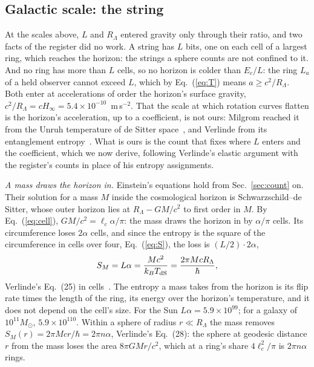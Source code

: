 \documentclass[aps,prd,twocolumn,superscriptaddress,nofootinbib,showkeys]{revtex4-2}
\newcommand{\lc}{\ell_c}
\newcommand{\Ec}{E_c}
\newcommand{\RL}{R_\Lambda}
\begin{document}
\subsection{Galactic scale: the string}\label{sec:galactic}

At the scales above, $L$ and $\RL$ entered gravity only through their ratio, and two facts of the register did no work. A string has $L$ bits, one on each cell of a largest ring, which reaches the horizon: the strings a sphere counts are not confined to it. And no ring has more than $L$ cells, so no horizon is colder than $\Ec/L$: the ring $L_a$ of a held observer cannot exceed $L$, which by Eq.~(\ref{eq:T}) means $a \ge c^2/\RL$. Both enter at accelerations of order the horizon's surface gravity, $c^2/\RL = cH_\infty = 5.4\times10^{-10}$~m\,s$^{-2}$. That the scale at which rotation curves flatten is the horizon's acceleration, up to a coefficient, is not ours: Milgrom reached it from the Unruh temperature of de Sitter space~\cite{milgrom1999}, and Verlinde from its entanglement entropy~\cite{verlinde2017}. What is ours is the count that fixes where $L$ enters and the coefficient, which we now derive, following Verlinde's elastic argument with the register's counts in place of his entropy assignments.

\textit{A mass draws the horizon in.} Einstein's equations hold from Sec.~\ref{sec:count} on. Their solution for a mass $M$ inside the cosmological horizon is Schwarzschild--de Sitter, whose outer horizon lies at $\RL - GM/c^2$ to first order in $M$. By Eq.~(\ref{eq:cell}), $GM/c^2 = \lc\alpha/\pi$: the mass draws the horizon in by $\alpha/\pi$ cells. Its circumference loses $2\alpha$ cells, and since the entropy is the square of the circumference in cells over four, Eq.~(\ref{eq:S}), the loss is $(L/2)\cdot2\alpha$,
\begin{equation}
S_M = L\alpha = \frac{Mc^2}{k_BT_{\rm dS}} = \frac{2\pi Mc\RL}{\hbar} ,
\label{eq:SM}
\end{equation}
Verlinde's Eq.~(25) in cells~\cite{verlinde2017}. The entropy a mass takes from the horizon is its flip rate times the length of the ring, its energy over the horizon's temperature, and it does not depend on the cell's size. For the Sun $L\alpha = 5.9\times10^{99}$; for a galaxy of $10^{11}M_\odot$, $5.9\times10^{110}$. Within a sphere of radius $r\ll\RL$ the mass removes $S_M(r) = 2\pi Mcr/\hbar = 2\pi n\alpha$, Verlinde's Eq.~(28): the sphere at geodesic distance $r$ from the mass loses the area $8\pi GMr/c^2$, which at a ring's share $4\lc^2/\pi$ is $2\pi n\alpha$ rings.
\end{document}
